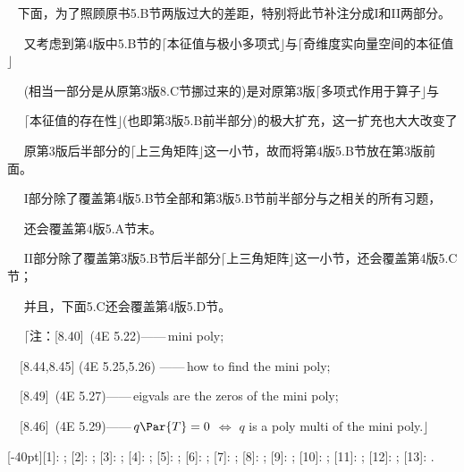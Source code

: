 {\Comment\,\,\, 下面，为了照顾原书{\tgbf 5.B}节两版过大的差距，特别将此节补注分成{\tgbf I}和{\tgbf II}两部分。\par\qquad\qquad\,\,\,\,\,\,
又考虑到第4版中{\tgbf 5.B}节的$\lceil$本征值与极小多项式$\rfloor$与$\lceil$奇维度实向量空间的本征值$\rfloor$\par\qquad\qquad\,\,\,\,\,\,
(相当一部分是从原第3版{\tgbf 8.C}节挪过来的)是对原第3版$\lceil$多项式作用于算子$\rfloor$与\par\qquad\qquad\,\,\,\,\,\,
$\lceil$本征值的存在性$\rfloor$(也即第3版{\tgbf 5.B}前半部分)的极大扩充，这一扩充也大大改变了\par\qquad\qquad\,\,\,\,\,\,
原第3版后半部分的$\lceil$上三角矩阵$\rfloor$这一小节，故而将第4版{\tgbf 5.B}节放在第3版前面。{\par}\qquad\qquad\,\,\,\,\,\,
{\tgbf I}部分除了覆盖第4版{\tgbf 5.B}节全部和第3版{\tgbf 5.B}节前半部分与之相关的所有习题，{\Large\par}\qquad\qquad\,\,\,\,\,\,
还会覆盖第4版{\tgbf 5.A}节末。\par\qquad\qquad\,\,\,\,\,\,
{\tgbf II}部分除了覆盖第3版5.B节后半部分$\lceil$上三角矩阵$\rfloor$这一小节，还会覆盖第4版{\tgbf 5.C}节；\par\qquad\qquad\,\,\,\,\,\,
并且，下面{\tgbf 5.C}还会覆盖第4版{\tgbf 5.D}节。\par\qquad\qquad\,\,\,\,\,\,
$\lceil$注：[8.40]\qquad\, \OR (4E 5.22)\qquad ——\,mini poly;\par\qquad\qquad\qquad\quad\,\,\,\,
[8.44,8.45] \OR (4E 5.25,5.26) ——\,how to find the mini poly;\par\qquad\qquad\qquad\quad\,\,\,\,
[8.49]\qquad\, \OR (4E 5.27)\qquad ——\,eigvals are the zeros of the mini poly;\par\qquad\qquad\qquad\quad\,\,\,\,
[8.46]\qquad\, \OR (4E 5.29)\qquad ——\,$q\Par{T} = 0$ $\Leftrightarrow$ $q$ is a poly multi of the mini poly.$\rfloor$
}\par\large


[-40pt]{[1]: ; [2]: ; [3]: ; [4]: ; [5]: ; [6]: ; [7]: ; [8]: ; [9]: ; [10]: ; [11]: ; [12]: ; [13]: .}

